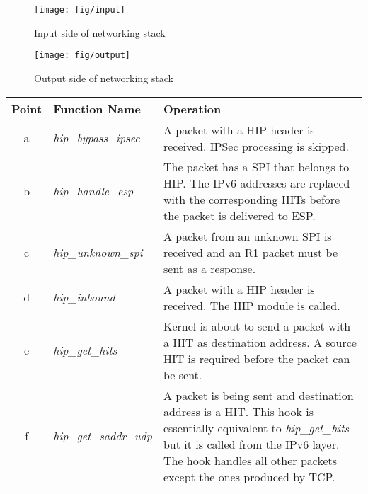 \begin{figure}
   \begin{minipage}[b]{0.4\textwidth}
      \centering
      \texttt{[image: fig/input]}
      \caption{Input side of networking stack}
      \label{fig:input_hooks}
   \end{minipage}%
   \hfill%
   \begin{minipage}[b]{0.9\textwidth}
      \centering
      \centering
      \texttt{[image: fig/output]}
      \caption{Output side of networking stack}
      \label{fig:output_hooks}
   \end{minipage}%
\end{figure}

\setlongtables
\begin{longtable}{|c|p{}|p{}|}
\\\hline
\endhead
\endfoot
Point & Function Name & Operation \\\hline

a & \textit{hip\_bypass\_ipsec} &

A packet with a HIP header is received. IPSec processing is skipped. \\

b & \textit{hip\_handle\_esp} &

The packet has a SPI that belongs to HIP. The IPv6 addresses are
replaced with the corresponding HITs before the packet is delivered to
ESP. \\

c & \textit{hip\_unknown\_spi} &

A packet from an unknown SPI is received and an R1 packet must be sent
as a response.\\

d & \textit{hip\_inbound} &

A packet with a HIP header is received. The HIP module is called.\\

e & \textit{hip\_get\_hits} &

Kernel is about to send a packet with a HIT as destination address. A
source HIT is required before the packet can be sent.\\

f & \textit{hip\_get\_saddr\_udp} &

A packet is being sent and destination address is a HIT. This hook is
essentially equivalent to \textit{hip\_get\_hits} but it is called
from the IPv6 layer. The hook handles all other packets except the
ones produced by TCP.\\


\end{longtable}
